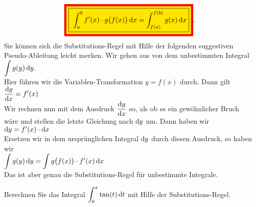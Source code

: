 \begin{equation}
  \label{eq:subst}
\colorbox{red}{\colorbox{orange}{\framebox{
$\ds\int_a^b f'(x) \cdot  g\bigl(f(x)\bigr)\, \dr x = \int_{f(a)}^{f(b)} g(x)\, \dr x$}}}.  
\end{equation}
Sie k\"onnen sich die Substitutions-Regel mit Hilfe der folgenden suggestiven Pseudo-Ableitung
leicht merken.  Wir gehen aus von dem unbestimmten Integral 
\\[0.2cm]
\hspace*{1.3cm}
$\displaystyle\int g(y)\, \textrm{d} y$.
\\[0.2cm]
Hier f\"uhren wir die Variablen-Transformation $y = f(x)$ durch. Dann gilt 
\\[0.2cm]
\hspace*{1.3cm}
$\displaystyle \frac{\textrm{d} y}{\textrm{d} x} = f'(x)$
\\[0.2cm]
Wir rechnen nun mit dem Ausdruck $\displaystyle\frac{\textrm{d} y}{\textrm{d} x}$ so, als ob es ein gew\"ohnlicher Bruch w\"are und stellen die
letzte Gleichung nach $\textrm{d} y$ um.  Dann haben wir 
\\[0.2cm]
\hspace*{1.3cm}
$\textrm{d} y = f'(x)\cdot \textrm{d} x$
\\[0.2cm]
Ersetzen wir in dem urspr\"unglichen Integral $\textrm{d} y$ durch diesen Ausdruck, so haben wir 
\\[0.2cm]
\hspace*{1.3cm}
$\displaystyle\int g(y)\, \textrm{d} y = \int g\bigl(f(x)\bigr)\cdot f'(x)\, \textrm{d} x$
\\[0.2cm]
Das ist aber genau die Substitutions-Regel f\"ur unbestimmte Integrale.

\exercise
Berechnen Sie das Integral $\displaystyle \int_0^x \tan(t)\, \textrm{d} t$ mit Hilfe der Substitutions-Regel.  \eox

